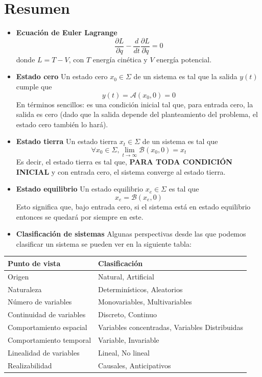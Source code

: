 \documentclass[
  11pt,
  letterpaper,
   addpoints,
   answers
  ]{exam}
\begin{document}
\begin{questions}
\begin{solution}
    
\end{solution}
\end{questions}
\newpage
\section{Resumen}
\begin{itemize}
    \item \textbf{Ecuación de Euler Lagrange}
    \[
    \frac{\partial L}{\partial q} - \frac{d}{dt} \frac{\partial L}{\partial \dot{q}} = 0 \tag{1}
    \]
    donde $L = T - V$, con $T$ energía cinética y $V$ energía potencial.
    \item \textbf{Estado cero} Un estado cero $x_0 \in \Sigma$ de un sistema es tal que la salida $y(t)$ cumple que
    \[
    y(t) = \mathcal{A}(x_0, 0) = 0 \tag{2}
    \]
    En términos sencillos: es una condición inicial tal que, para entrada cero, la salida es cero (dado que la salida depende del planteamiento del problema, el estado cero también lo hará).

    \item \textbf{Estado tierra} Un estado tierra $x_t \in \Sigma$ de un sistema es tal que
    \[
    \forall x_0 \in \Sigma, \lim_{t \to \infty} \mathcal{B}(x_0, 0) = x_t \tag{3}
    \]
    Es decir, el estado tierra es tal que, \textbf{PARA TODA CONDICIÓN INICIAL} y con entrada cero, el sistema converge al estado tierra.

    \item \textbf{Estado equilibrio} Un estado equilibrio $x_e \in \Sigma$ es tal que
    \[
    x_e = \mathcal{B}(x_e, 0) \tag{4}
    \]
    Esto significa que, bajo entrada cero, si el sistema está en estado equilibrio entonces se quedará por siempre en este.

    \item \textbf{Clasificación de sistemas} Algunas perspectivas desde las que podemos clasificar un sistema se pueden ver en la siguiente tabla:
\end{itemize}

\begin{table}[h!]
\centering
\begin{tabular}{|l|l|}
\hline
\textbf{Punto de vista} & \textbf{Clasificación} \\ \hline
Origen & Natural, Artificial \\ \hline
Naturaleza & Determinísticos, Aleatorios \\ \hline
Número de variables & Monovariables, Multivariables \\ \hline
Continuidad de variables & Discreto, Continuo \\ \hline
Comportamiento espacial & Variables concentradas, Variables Distribuidas \\ \hline
Comportamiento temporal & Variable, Invariable \\ \hline
Linealidad de variables & Lineal, No lineal \\ \hline
Realizabilidad & Causales, Anticipativos \\ \hline
\end{tabular}
\end{table}
\end{document}
